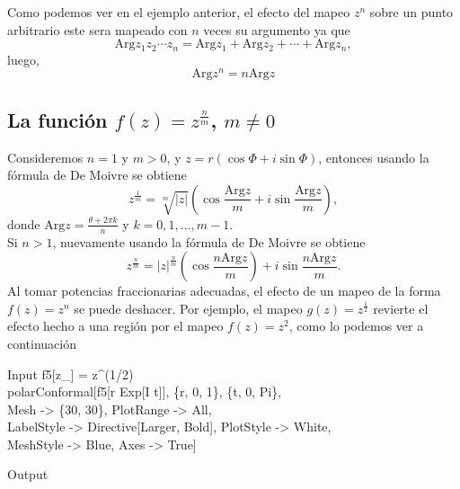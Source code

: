 Como podemos ver en el ejemplo anterior, el efecto del mapeo $z^n$ sobre un punto arbitrario este sera mapeado con  $n$ veces su argumento ya que
$$\mbox{Arg}z_1z_2\cdots  z_n=\mbox{Arg}z_1+\mbox{Arg}z_2+\cdots+\mbox{Arg}z_n,$$
luego, $$\mbox{Arg}z^n=n\mbox{Arg}z$$

\subsection{La función $f(z)=z^\frac{n}{m}$, $m\neq 0$}
Consideremos $n=1$ y $m>0$, y $z=r(\cos\Phi+i\sin\Phi)$, entonces usando la fórmula de De Moivre se obtiene
$$z^\frac{1}{m}=\sqrt[m]{|z|}\left(\cos\dfrac{\mbox{Arg}z}{m}+i\sin\dfrac{\mbox{Arg}z}{m}\right),$$
donde $\mbox{Arg}z=\frac{\theta+2\pi k}{n}$ y $k=0,1,\ldots,m-1$.\\
Si $n>1$, nuevamente usando la fórmula de De Moivre se obtiene
$$z^\frac{n}{m}=|z|^{\frac{n}{m}}\left(\cos\dfrac{n\mbox{Arg}z}{m}\right)+i\sin\dfrac{n\mbox{Arg}z}{m}.$$
Al tomar potencias fraccionarias adecuadas, el efecto de un mapeo de la forma $f(z)=z^n$ se puede deshacer. Por ejemplo, el mapeo $g(z)=z^\frac{1}{2}$ revierte el efecto hecho a una región por el mapeo $f(z)=z^2$, como lo podemos ver a continuación
\begin{mmaCell}{Input}
 	f5[z_] = z^(1/2) \\polarConformal[f5[r Exp[I t]], \{r, 0, 1\}, \{t, 0, Pi\},\\Mesh -> \{30, 30\}, PlotRange -> All,\\LabelStyle -> Directive[Larger, Bold], PlotStyle -> White,\\MeshStyle -> Blue, Axes -> True]
\end{mmaCell}
\begin{mmaCell}[moregraphics={moreig={scale=0.7}}]{Output}
\end{mmaCell}

